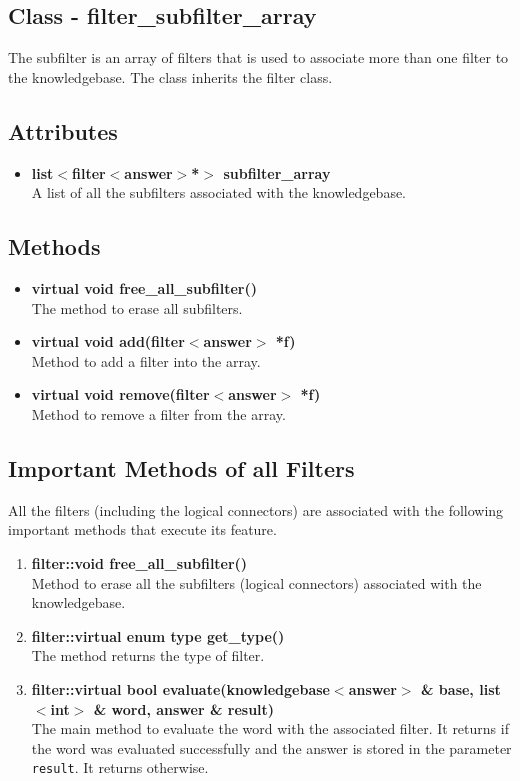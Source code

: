 \subsection{Class - filter\_subfilter\_array}
The subfilter is an array of filters that is used to associate more than one filter to the knowledgebase. The class inherits the filter class.
\subsection*{Attributes}
\begin{itemize}
 \item \textbf{list$<$filter$<$answer$>$*$>$ subfilter\_array} \\
	A list of all the subfilters associated with the knowledgebase.
\end{itemize}
\subsection*{Methods}
\begin{itemize}
 \item \textbf{virtual void free\_all\_subfilter()} \\
	The method to erase all subfilters.
 \item \textbf{virtual void add(filter$<$answer$>$ *f)} \\
	Method to add a filter into the array.
 \item \textbf{virtual void remove(filter$<$answer$>$ *f)} \\
	Method to remove a filter from the array.
\end{itemize}

\subsection{Important Methods of all Filters}

All the filters (including the logical connectors) are associated with the following important methods that execute its feature.

\begin{enumerate}
 
\item \textbf{filter::void free\_all\_subfilter()} \\
	Method to erase all the subfilters (logical connectors) associated with the knowledgebase.
 \item \textbf{filter::virtual enum type get\_type()} \\
	The method returns the type of filter. 
 \item \textbf{filter::virtual bool evaluate(knowledgebase$<$answer$>$ \& base, list$<$int$>$ \& word, answer \& result)} \\
	The main method to evaluate the word with the associated filter. It returns \true if the word was evaluated successfully and the answer is stored in the parameter \texttt{result}. It returns \false otherwise.
\end{enumerate}


